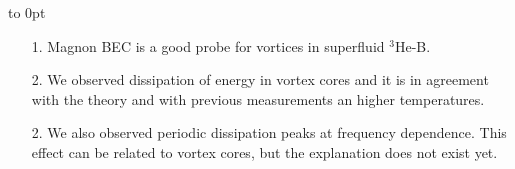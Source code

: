 \vbox to 0pt{\parbox{24cm}{
\begin{itemize}
\item[1.] Magnon BEC is a good probe for vortices in superfluid $^3$He-B.
\item[2.] We observed dissipation of energy in vortex cores and it is
          in agreement with the theory and with previous measurements
          an higher temperatures.
\item[2.] We also observed periodic dissipation peaks at frequency
          dependence. This effect can be related to vortex cores,
          but the explanation does not exist yet.
\end{itemize}
}\hss}